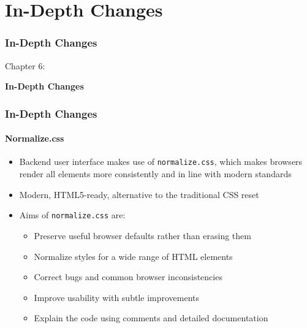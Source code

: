 %

\section{In-Depth Changes}
\begin{frame}[fragile]
	\frametitle{In-Depth Changes}

	\begin{center}\huge{Chapter 6:}\end{center}
	\begin{center}\huge{\color{typo3darkgrey}\textbf{In-Depth Changes}}\end{center}

\end{frame}


\begin{frame}[fragile]
	\frametitle{In-Depth Changes}
	\framesubtitle{Normalize.css}

	\begin{itemize}
		\item Backend user interface makes use of \texttt{normalize.css},\newline
			which makes browsers render all elements more consistently and in line with modern standards
		\item Modern, HTML5-ready, alternative to the traditional CSS reset
		\item Aims of \texttt{normalize.css} are:

			\begin{itemize}
				\item Preserve useful browser defaults rather than erasing them
				\item Normalize styles for a wide range of HTML elements
				\item Correct bugs and common browser inconsistencies
				\item Improve usability with subtle improvements
				\item Explain the code using comments and detailed documentation
			\end{itemize}

	\end{itemize}

\end{frame}

